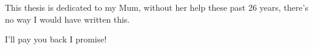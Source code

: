 
\begin{dedication} %

This thesis is dedicated to my Mum, without her help these past 26 years, there's no way I would have written this.

I'll pay you back I promise!

\end{dedication}


